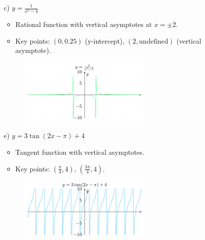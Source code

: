\documentclass{article}
\newenvironment{solution}{\color{solutioncolor}}{}
\begin{document}
\begin{enumerate}
\begin{solution}
\begin{figure}[h]
    \label{fig:image}
\end{figure}   
    \end{solution}
    \item[c)] \( y = \frac{1}{x^2 - 4} \)
    \begin{solution}
       \begin{itemize}
           \item Rational function with vertical asymptotes at \( x = \pm 2 \).
           \item Key points: \((0, 0.25)\) (y-intercept), \((2, \text{undefined})\) (vertical asymptote).
       \end{itemize}
     \begin{figure}[h]
    \centering
    \includegraphics[width=0.62\textwidth]{imgs/imgs FSE/y=1_x^2-4.png}
    \label{fig:image}
\end{figure}  
    \end{solution}
    \item[e)] \( y = 3\tan(2x - \pi) + 4 \)
    \begin{solution}
       \begin{itemize}
           \item Tangent function with vertical asymptotes.
           \item Key points: \(\left(\frac{\pi}{4}, 4\right)\), \(\left(\frac{3\pi}{4}, 4\right)\).
       \end{itemize}
\begin{figure}[h]
    \centering
    \includegraphics[width=0.62\textwidth]{imgs/imgs FSE/y=3tan(2x-pi)+4.png}
    \label{fig:image}
\end{figure}       

\end{solution}
\end{enumerate}
\end{document}
